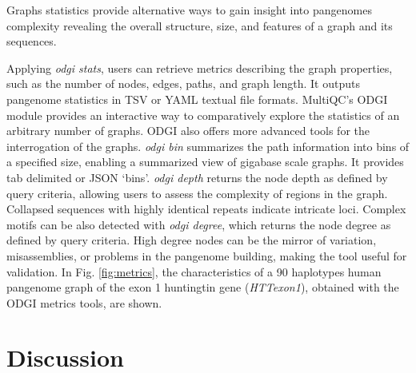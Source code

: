 \documentclass{bioinfo}
\begin{document}


Graphs statistics provide alternative ways to gain insight into pangenomes complexity revealing the overall structure, size, and features of a graph and its sequences.

Applying \textit{odgi stats}, users can retrieve metrics describing the graph properties, such as the number of nodes, edges, paths, and graph length. It outputs pangenome statistics in TSV or YAML textual file formats.
MultiQC's \citep{Ewels_2016} ODGI module %
provides an interactive way to comparatively explore the statistics of an arbitrary number of graphs.
ODGI also offers more advanced tools for the interrogation of the graphs. \textit{odgi bin} summarizes the path information into bins of a specified size, enabling a summarized view of gigabase scale graphs. It provides tab delimited or JSON `bins'.
\textit{odgi depth} returns the node depth as defined by query criteria, allowing users to assess the complexity of regions in the graph.
Collapsed sequences with highly identical repeats indicate intricate loci.
Complex motifs can be also detected with \textit{odgi degree}, which returns the node degree as defined by query criteria.
High degree nodes can be the mirror of variation, misassemblies, or problems in the pangenome building, making the tool useful for validation.
In Fig. \ref{fig:metrics}, the characteristics of a 90 haplotypes human pangenome graph of the exon 1 huntingtin gene \citep{Sathasivam2013,Neueder2017} (\textit{HTTexon1}), obtained with the ODGI metrics tools, are shown.










\section{Discussion}

\end{document}
